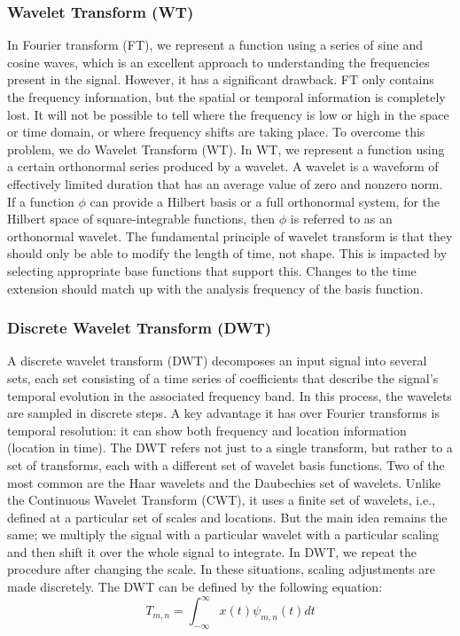 \subsubsection{Wavelet Transform (WT)}
In Fourier transform (FT), we represent a function using a series of sine and cosine waves, which is an excellent approach to understanding the frequencies present in the signal. However, it has a significant drawback. FT only contains the frequency information, but the spatial or temporal information is completely lost. It will not be possible to tell where the frequency is low or high in the space or time domain, or where frequency shifts are taking place. To overcome this problem, we do Wavelet Transform (WT). In WT, we represent a function using a certain orthonormal series produced by a wavelet. A wavelet is a waveform of effectively limited duration that has an average value of zero and nonzero norm. If a function $\phi$ can provide a Hilbert basis or a full orthonormal system, for the Hilbert space of square-integrable functions, then $\phi$ is referred to as an orthonormal wavelet. The fundamental principle of wavelet transform is that they should only be able to modify the length of time, not shape. This is impacted by selecting appropriate base functions that support this. Changes to the time extension should match up with the analysis frequency of the basis function. 

\subsubsection{Discrete Wavelet Transform (DWT)}
A discrete wavelet transform (DWT) \cite{shensa1992discrete} decomposes an input signal into several sets, each set consisting of a time series of coefficients that describe the signal's temporal evolution in the associated frequency band. In this process, the wavelets are sampled in discrete steps. A key advantage it has over Fourier transforms is temporal resolution: it can show both frequency and location information (location in time). The DWT refers not just to a single transform, but rather to a set of transforms, each with a different set of wavelet basis functions. Two of the most common are the Haar wavelets and the Daubechies set of wavelets. Unlike the Continuous Wavelet Transform (CWT), it uses a finite set of wavelets, i.e., defined at a particular set of scales and locations. But the main idea remains the same; we multiply the signal with a particular wavelet with a particular scaling and then shift it over the whole signal to integrate. In DWT, we repeat the procedure after changing the scale. In these situations, scaling adjustments are made discretely.
The DWT can be defined by the following equation:
\begin{equation}
    T_{m,n} = \int_{-\infty}^{\infty} x(t) \psi _{m,n} (t) dt 
\end{equation}

